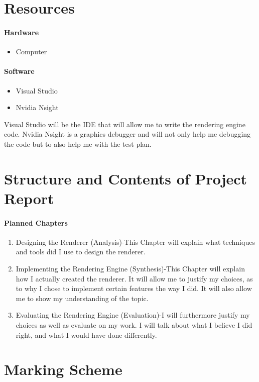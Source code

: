 \section{Resources}
\paragraph{Hardware}
\begin{itemize}
  \item Computer
  
\end{itemize}
\paragraph{Software}
\begin{itemize}
  \item Visual Studio
  \item Nvidia Nsight
\end{itemize}
Visual Studio will be the IDE that will allow me to write the rendering engine code.
Nvidia Nsight is a graphics debugger and will not only help me debugging the code but to also help me with the test plan.
\section{Structure and Contents of Project Report}
\paragraph{Planned Chapters}
\begin{enumerate}
  \item Designing the Renderer (Analysis)-This Chapter will explain what techniques and tools did I use to design the renderer. 
  \item Implementing the Rendering Engine (Synthesis)-This Chapter will explain how I actually created the renderer. It will allow me to justify my choices, as to why I chose to implement certain features the way I did. It will also allow me to show my understanding of the topic.
 
  \item Evaluating the Rendering Engine (Evaluation)-I will furthermore justify my choices as well as evaluate on my work. I will talk about what I believe I did right, and what I would have done differently.
\end{enumerate}

\section{Marking Scheme}

